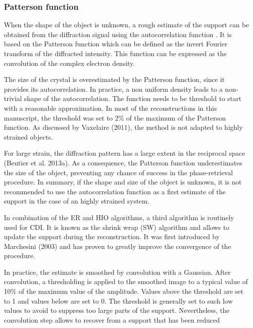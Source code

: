\subsubsection{Patterson function}
When the shape of the object is unknown, a rough estimate of the support can be obtained from the diffraction signal using the autocorrelation function \parencite{marchesini_x-ray_2003}.
 It is based on the Patterson function which can be defined as the invert Fourier transform of the diffracted intensity.
 This function can be expressed as the convolution of the complex electron density.

The size of the crystal is overestimated by the Patterson function, since it provides its autocorrelation.
In practice, a non uniform density leads to a non-trivial shape of the autocorrelation.
The function needs to be threshold to start with a reasonable approximation. In most of the reconstructions in this manuscript, the threshold was set to 2\% of the maximum of the Patterson function.
As discussed by Vaxelaire (2011), the method is not adapted to highly strained objects.

For large strain, the diffraction pattern has a large extent in the reciprocal space (Beutier et al. 2013a).
As a consequence, the Patterson function underestimates the size of the object, preventing any chance of success in the phase-retrieval procedure.
In summary, if the shape and size of the object is unknown, it is not recommended to use the autocorrelation function as a first estimate of the support in the case of an highly strained system.

In combination of the ER and HIO algorithms, a third algorithm is routinely used for CDI.
It is known as the shrink wrap (SW) algorithm and allows to update the support during the reconstruction.
It was first introduced by Marchesini (2003) and has proven to greatly improve the convergence of the procedure.

In practice, the estimate is smoothed by convolution with a Gaussian.
After convolution, a thresholding is applied to the smoothed image to a typical value of 10\% of the maximum value of the amplitude.
Values above the threshold are set to 1 and values below are set to 0.
The threshold is generally set to such low values to avoid to suppress too large parts of the support.
Nevertheless, the convolution step allows to recover from a support that has been reduced



